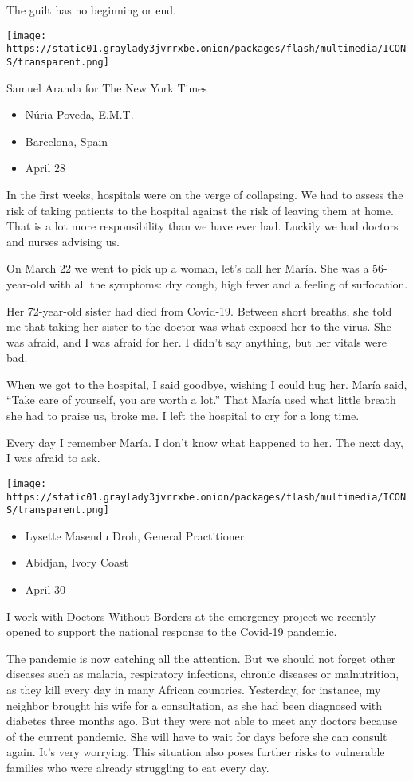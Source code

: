 The guilt has no beginning or end.

\texttt{[image: https://static01.graylady3jvrrxbe.onion/packages/flash/multimedia/ICONS/transparent.png]}

Samuel Aranda for The New York Times

\begin{itemize}
\tightlist
\item
  Núria Poveda, E.M.T.
\item
  Barcelona, Spain
\item
  April 28
\end{itemize}

In the first weeks, hospitals were on the verge of collapsing. We had to
assess the risk of taking patients to the hospital against the risk of
leaving them at home. That is a lot more responsibility than we have
ever had. Luckily we had doctors and nurses advising us.

On March 22 we went to pick up a woman, let's call her María. She was a
56-year-old with all the symptoms: dry cough, high fever and a feeling
of suffocation.

Her 72-year-old sister had died from Covid-19. Between short breaths,
she told me that taking her sister to the doctor was what exposed her to
the virus. She was afraid, and I was afraid for her. I didn't say
anything, but her vitals were bad.

When we got to the hospital, I said goodbye, wishing I could hug her.
María said, ``Take care of yourself, you are worth a lot.'' That María
used what little breath she had to praise us, broke me. I left the
hospital to cry for a long time.

Every day I remember María. I don't know what happened to her. The next
day, I was afraid to ask.

\texttt{[image: https://static01.graylady3jvrrxbe.onion/packages/flash/multimedia/ICONS/transparent.png]}

\begin{itemize}
\tightlist
\item
  Lysette Masendu Droh, General Practitioner
\item
  Abidjan, Ivory Coast
\item
  April 30
\end{itemize}

I work with Doctors Without Borders at the emergency project we recently
opened to support the national response to the Covid-19 pandemic.

The pandemic is now catching all the attention. But we should not forget
other diseases such as malaria, respiratory infections, chronic diseases
or malnutrition, as they kill every day in many African countries.
Yesterday, for instance, my neighbor brought his wife for a
consultation, as she had been diagnosed with diabetes three months ago.
But they were not able to meet any doctors because of the current
pandemic. She will have to wait for days before she can consult again.
It's very worrying. This situation also poses further risks to
vulnerable families who were already struggling to eat every day.


